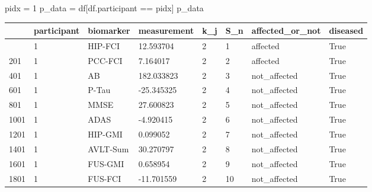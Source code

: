 \documentclass[
  letterpaper,
  DIV=11,
  numbers=noendperiod]{scrreprt}
\newenvironment{Shaded}{\begin{snugshade}}{\end{snugshade}}
\newcommand{\DecValTok}[1]{\textcolor[rgb]{0.68,0.00,0.00}{#1}}
\newcommand{\NormalTok}[1]{\textcolor[rgb]{0.00,0.23,0.31}{#1}}
\newcommand{\OperatorTok}[1]{\textcolor[rgb]{0.37,0.37,0.37}{#1}}
\begin{document}
\begin{Shaded}
\begin{Highlighting}[]
\NormalTok{pidx }\OperatorTok{=} \DecValTok{1}
\NormalTok{p\_data }\OperatorTok{=}\NormalTok{ df[df.participant }\OperatorTok{==}\NormalTok{ pidx]}
\NormalTok{p\_data}
\end{Highlighting}
\end{Shaded}

\begin{longtable}[]{@{}llllllll@{}}
\toprule\noalign{}
& participant & biomarker & measurement & k\_j & S\_n &
affected\_or\_not & diseased \\
\midrule\noalign{}
\endhead
\bottomrule\noalign{}
\endlastfoot
1 & 1 & HIP-FCI & 12.593704 & 2 & 1 & affected & True \\
201 & 1 & PCC-FCI & 7.164017 & 2 & 2 & affected & True \\
401 & 1 & AB & 182.033823 & 2 & 3 & not\_affected & True \\
601 & 1 & P-Tau & -25.345325 & 2 & 4 & not\_affected & True \\
801 & 1 & MMSE & 27.600823 & 2 & 5 & not\_affected & True \\
1001 & 1 & ADAS & -4.920415 & 2 & 6 & not\_affected & True \\
1201 & 1 & HIP-GMI & 0.099052 & 2 & 7 & not\_affected & True \\
1401 & 1 & AVLT-Sum & 30.270797 & 2 & 8 & not\_affected & True \\
1601 & 1 & FUS-GMI & 0.658954 & 2 & 9 & not\_affected & True \\
1801 & 1 & FUS-FCI & -11.701559 & 2 & 10 & not\_affected & True \\
\end{longtable}
\end{document}
